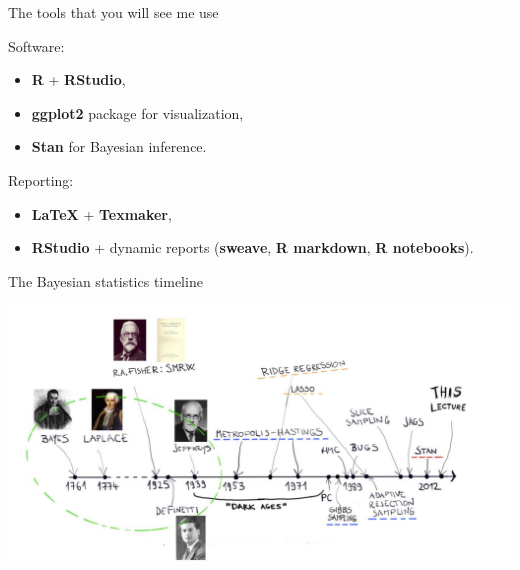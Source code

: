 \begin{frame}{The tools that you will see me use}

Software:
\begin{itemize}
\item \textbf{R} + \textbf{RStudio},
\item \textbf{ggplot2} package for visualization,
\item \textbf{Stan} for Bayesian inference.
\end{itemize}

\bigskip

Reporting:

\begin{itemize}
\item \textbf{LaTeX} + \textbf{Texmaker},
\item \textbf{RStudio} + dynamic reports (\textbf{sweave}, \textbf{R markdown}, \textbf{R notebooks}).
\end{itemize}

\end{frame}


\begin{frame}{The Bayesian statistics timeline}
\begin{center}
\includegraphics[width=0.99\linewidth]{../LectureAssets/L00/timeline}
\end{center}
\end{frame}

